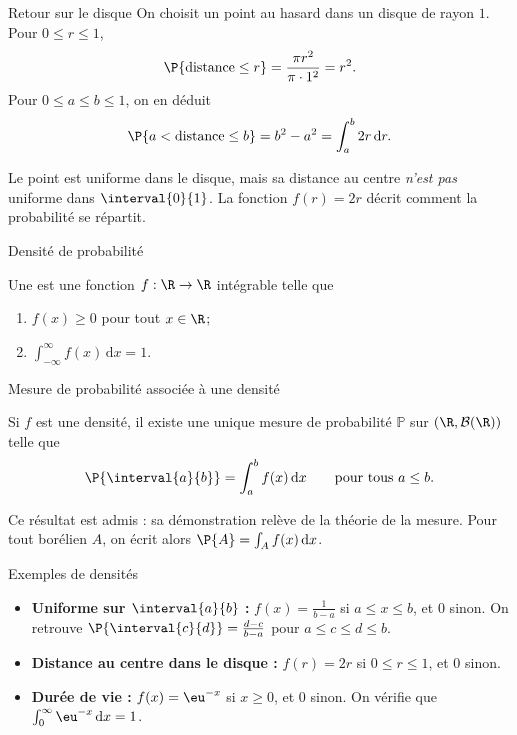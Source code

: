 \documentclass[nuit,charter,pied]{BeamerJS}
\newcommand{\borel}{\mathcal{B}(\R)}
\begin{document}
\begin{frame}[t]{Retour sur le disque}
\pause
	On choisit un point au hasard dans un disque de rayon \(1\). Pour \(0\leq r\leq 1\),
	\[\P{\text{distance}\leq r}=\frac{\pi r^2}{\pi\cdot 1^2}=r^2.\]
	\pause
	Pour \(0\leq a\leq b\leq 1\), on en déduit
	\[\P{a<\text{distance}\leq b}=b^2-a^2=\int_a^b 2r\,\mathrm{d}r.\]
	\pause
	\begin{lumiere}
		Le point est uniforme dans le disque, mais sa distance au centre \emph{n'est pas} uniforme dans \(\interval{0}{1}\). La fonction \(f(r)=2r\) décrit comment la probabilité se répartit.
	\end{lumiere}
\end{frame}

\begin{frame}[t]{Densité de probabilité}
\pause
	\begin{defn}
		Une  est une fonction \(f:\R\to\R\) intégrable telle que\pause
		\begin{enumerate}
			\item \(f(x)\geq 0\) pour tout \(x\in\R\);\pause
			\item \(\displaystyle\int_{-\infty}^{\infty}f(x)\,\mathrm{d}x=1\).
		\end{enumerate}
	\end{defn}
\end{frame}

\begin{frame}[t]{Mesure de probabilité associée à une densité}
	\pause
	\begin{prop}
		Si \(f\) est une densité, il existe une unique mesure de probabilité \(\mathbb{P}\) sur \((\R,\borel)\) telle que
		\[\P{\interval{a}{b}}=\int_a^b f(x)\,\mathrm{d}x\qquad\text{pour tous } a\leq b.\]
	\end{prop}
	\pause
	\begin{lumiere}
		Ce résultat est admis : sa démonstration relève de la théorie de la mesure. Pour tout borélien \(A\), on écrit alors \(\P{A}=\int_A f(x)\,\mathrm{d}x\).
	\end{lumiere}
\end{frame}

\begin{frame}{Exemples de densités}
\pause
	\begin{exs}
		\begin{itemize}
			\item \textbf{Uniforme sur \(\interval{a}{b}\) :} \(f(x)=\frac{1}{b-a}\) si \(a\leq x\leq b\), et \(0\) sinon. \pause On retrouve \(\P{\interval{c}{d}}=\frac{d-c}{b-a}\) pour \(a\leq c\leq d\leq b\).\pause
			\item \textbf{Distance au centre dans le disque :} \(f(r)=2r\) si \(0\leq r\leq 1\), et \(0\) sinon.\pause
			\item \textbf{Durée de vie :} \(f(x)=\eu^{-x}\) si \(x\geq 0\), et \(0\) sinon. \pause On vérifie que \(\int_0^{\infty}\eu^{-x}\,\mathrm{d}x=1\).
		\end{itemize}
	\end{exs}
\end{frame}
\end{document}
